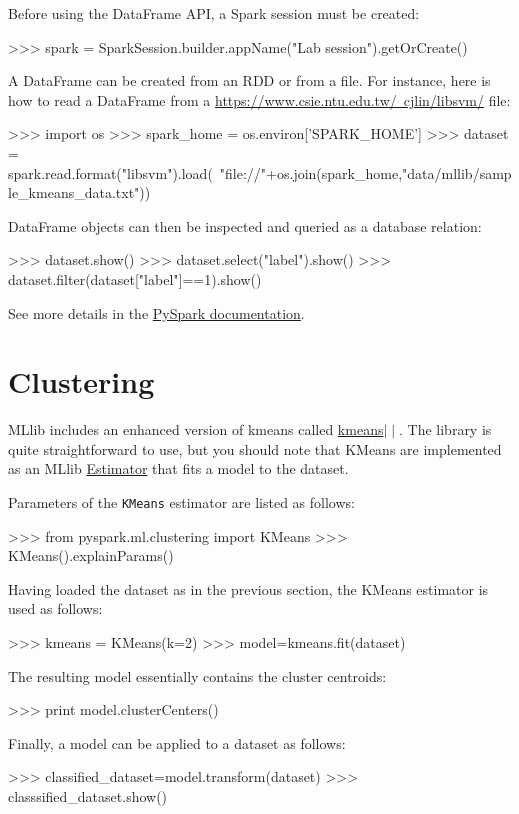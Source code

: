 \documentclass[11pt]{article}
\begin{document}
Before using the DataFrame API, a Spark session must be created:
\begin{cli}
  >>> spark = SparkSession.builder.appName("Lab session").getOrCreate()
\end{cli}
A DataFrame can be created from an RDD or from a file. For instance,
here is how to read a DataFrame from a
\href{libSVM}{https://www.csie.ntu.edu.tw/~cjlin/libsvm/} file:
\begin{cli}
  >>> import os
  >>> spark_home = os.environ['SPARK_HOME']
  >>> dataset = spark.read.format("libsvm").load(\
      "file://"+os.join(spark_home,"data/mllib/sample_kmeans_data.txt"))
\end{cli}
DataFrame objects can then be inspected and queried as a database relation:
\begin{cli}
>>> dataset.show()
>>> dataset.select("label").show()
>>> dataset.filter(dataset["label"]==1).show()
\end{cli}
See more details in the \href{http://spark.apache.org/docs/latest/api/python/pyspark.sql.html#pyspark.sql.DataFrame}{PySpark documentation}.

\section{Clustering}

MLlib includes an enhanced version of kmeans called
\href{http://theory.stanford.edu/~sergei/papers/vldb12-kmpar.pdf}{kmeans$\mid\mid$}. The
library is quite straightforward to use, but you should note that
KMeans are implemented as an MLlib
\href{http://spark.apache.org/docs/latest/api/python/pyspark.ml.html?highlight=estimator#pyspark.ml.Estimator}{Estimator}
that fits a model to the dataset.

Parameters of the \texttt{KMeans} estimator are listed as follows:
\begin{cli}
  >>> from pyspark.ml.clustering import KMeans
  >>> KMeans().explainParams()
\end{cli}
Having loaded the dataset as in the previous section, the KMeans
estimator is used as follows:
\begin{cli}
  >>> kmeans = KMeans(k=2)
  >>> model=kmeans.fit(dataset)
\end{cli}
The resulting model essentially contains the cluster centroids:
\begin{cli}
  >>> print model.clusterCenters()
\end{cli}
Finally, a model can be applied to a dataset as follows:
\begin{cli}
  >>> classified_dataset=model.transform(dataset)
  >>> classsified_dataset.show()
\end{cli}
\end{document}
